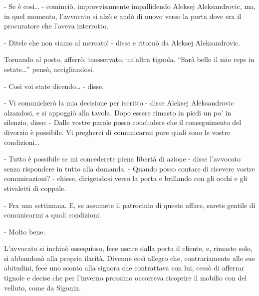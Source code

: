 - Se è così\ldots{} - cominciò, improvvisamente impallidendo Aleksej Aleksandrovic, ma, in quel momento, l'avvocato si alzò e andò di nuovo verso la porta dove era il procuratore che l'aveva interrotto. 

- Ditele che non siamo al mercato! - disse e ritornò da Aleksej Aleksandrovic. 

Tornando al posto, afferrò, inosservato, un'altra tignola. ``Sarà bello il mio reps in estate\ldots{}'' pensò, accigliandosi. 

- Così voi state dicendo\ldots{} - disse. 

- Vi comunicherò la mia decisione per iscritto - disse Aleksej Aleksandrovic alzandosi, e si appoggiò alla tavola. Dopo essere rimasto in piedi un po' in silenzio, disse: - Dalle vostre parole posso concludere che il conseguimento del divorzio è possibile. Vi pregherei di comunicarmi pure quali sono le vostre condizioni\ldots{} 

- Tutto è possibile se mi concederete piena libertà di azione - disse l'avvocato senza rispondere in tutto alla domanda. - Quando posso contare di ricevere vostre comunicazioni? - chiese, dirigendosi verso la porta e brillando con gli occhi e gli stivaletti di coppale. 

- Fra una settimana. E, se assumete il patrocinio di questo affare, sarete gentile di comunicarmi a quali condizioni. 

- Molto bene. 

L'avvocato si inchinò ossequioso, fece uscire dalla porta il cliente, e, rimasto solo, si abbandonò alla propria ilarità. Divenne così allegro che, contrariamente alle sue abitudini, fece uno sconto alla signora che contrattava con lui, cessò di afferrar tignole e decise che per l'inverno prossimo occorreva ricoprire il mobilio con del velluto, come da Sigonin. 

\label{vi-3} 

